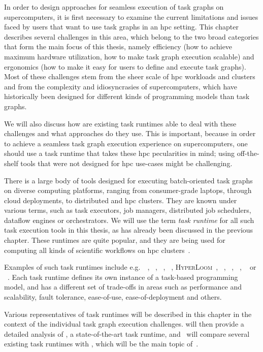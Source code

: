 In order to design approaches for seamless execution of task graphs on supercomputers, it is first
necessary to examine the current limitations and issues faced by users that want to use task graphs
in an \gls{hpc} setting. This chapter describes several challenges in this area, which
belong to the two broad categories that form the main focus of this thesis, namely efficiency (how
to achieve maximum hardware utilization, how to make task graph execution scalable) and ergonomics
(how to make it easy for users to define and execute task graphs). Most of these challenges stem
from the sheer scale of \gls{hpc} workloads and clusters and from the complexity and
idiosyncrasies of supercomputers, which have historically been designed for different kinds of
programming models than task graphs.

We will also discuss how are existing task runtimes able to deal with these challenges and what
approaches do they use. This is important, because in order to achieve a seamless task graph
execution experience on supercomputers, one should use a task runtime that takes these
\gls{hpc} pecularities in mind; using off-the-shelf tools that were not designed for
\gls{hpc} use-cases might be challenging.

There is a large body of tools designed for executing batch-oriented task graphs on diverse
computing platforms, ranging from consumer-grade laptops, through cloud deployments, to distributed
and \gls{hpc} clusters. They are known under various terms, such as task executors,
job managers, distributed job schedulers, dataflow engines or orchestrators. We will use the term
\emph{task runtime} for all such task execution tools in this thesis, as has already been
discussed in the previous chapter. These runtimes are quite popular, and they are being used for
computing all kinds of scientific workflows on \gls{hpc}
clusters~\cite{hpc_tasks, hpc_tasks_2, hpc_tasks_3, pegasus}.

Examples of such task runtimes include e.g.\ \dask~\cite{dask},
\parsl~\cite{parsl}, \ray~\cite{ray},
\pycompss~\cite{pycompss}, \textsc{HyperLoom}~\cite{hyperloom},
\gnuparallel~\cite{parallel}, \snakemake~\cite{snakemake},
\merlin~\cite{merlin},
\autosubmit~\cite{autosubmit} or \fireworks~\cite{fireworks}. Each task runtime
defines its own instance of a task-based programming model, and has a different set of trade-offs
in areas such as performance and scalability, fault tolerance, ease-of-use, ease-of-deployment and
others.

Various representatives of task runtimes will be described in this chapter in the context
of the individual task graph execution challenges.  will then provide a detailed
analysis of \dask{}, a state-of-the-art task runtime, and~ will compare
several existing task runtimes with \hyperqueue{}, which will be the main topic of~.

